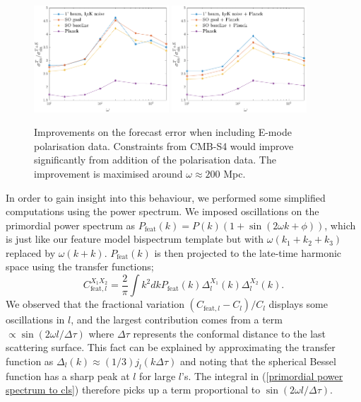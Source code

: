 \begin{figure}[ht]
	\centering
	\includegraphics[width=0.45\textwidth]{improvement_ratio.pdf}
	\includegraphics[width=0.45\textwidth]{improvement_ratio_combined.pdf}
	\caption{Improvements on the forecast error when including E-mode polarisation data. Constraints from CMB-S4 would improve significantly from addition of the polarisation data. The improvement is maximised around $\omega\approx200$ Mpc.}
	\label{forecast improvement ratio}
\end{figure}

In order to gain insight into this behaviour, we performed some simplified computations using the power spectrum. We imposed oscillations on the primordial power spectrum as $P_\textrm{feat}(k) = P(k)(1+\sin(2\omega k + \phi))$, which is just like our feature model bispectrum template but with $\omega(k_1+k_2+k_3)$ replaced by $\omega(k+k)$. $P_\textrm{feat}(k)$ is then projected to the late-time harmonic space using the transfer functions;
\begin{equation}
	C_{\text{feat},l}^{X_1 X_2} = \frac{2}{\pi} \int k^2 dk P_\textrm{feat}(k) \Delta_l^{X_1}(k) \Delta_l^{X_2}(k).
	\label{primordial power spectrum to cls}
\end{equation}
We observed that the fractional variation $(C_{\text{feat},l}-C_l)/C_l$ displays some oscillations in $l$, and the largest contribution comes from a term $\propto \sin(2\omega l/\Delta\tau)$ where $\Delta\tau$ represents the conformal distance to the last scattering surface. This fact can be explained by approximating the transfer function as $\Delta_l(k)\approx (1/3)j_l(k\Delta\tau)$ and noting that the spherical Bessel function has a sharp peak at $l$ for large $l$'s. The integral in (\ref{primordial power spectrum to cls}) therefore picks up a term proportional to $\sin(2\omega l/\Delta\tau)$.

